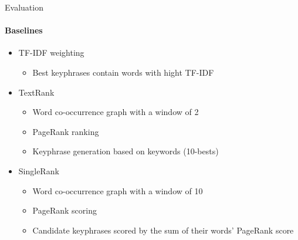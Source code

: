   \begin{frame}{Evaluation}
    \framesubtitle{Baselines}

    \begin{itemize}
      \item<+->{TF-IDF weighting}
      \begin{itemize}
        \item{Best keyphrases contain words with hight TF-IDF}
      \end{itemize}
      \item<+->{TextRank}
      \begin{itemize}
        \item{Word co-occurrence graph with a window of 2}
        \item{PageRank ranking}
        \item{Keyphrase generation based on keywords (10-bests)}
      \end{itemize}
      \item<+->{SingleRank}
      \begin{itemize}
        \item{Word co-occurrence graph with a window of 10}
        \item{PageRank scoring}
        \item{Candidate keyphrases scored by the sum of their words' PageRank score}
      \end{itemize}
    \end{itemize}

  \end{frame}

